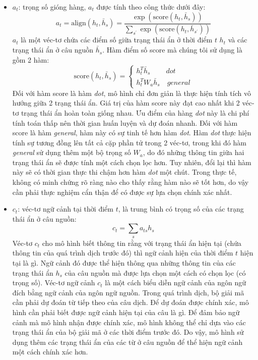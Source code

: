 \begin{itemize}
	\item $a_t$: trọng số gióng hàng, $a_t$ được tính theo công thức dưới đây:
	\begin{equation}
	a_t = \text{align}(h_t, \bar{h}_s) = \frac{\exp\left(\text{score}(h_t, \bar{h}_s)\right)}{\sum_{s^{'}}\exp\left(\text{score}(h_t, \bar{h}_{s^{'}})\right)}
	\end{equation}
	$a_t$ là một véc-tơ chứa các điểm số giữa trạng thái ẩn ở thời điểm $t$ $h_t$ và các trạng thái ẩn ở câu nguồn $\bar{h}_s$. Hàm điểm số score mà chúng tôi sử dụng là gồm 2 hàm:
	\begin{equation}
	\text{score}(h_t, \bar{h}_s) = \left\{
			\begin{array}{ll}
			h^T_t\bar{h}_s \ \quad\quad dot\\
			h^T_tW_a\bar{h}_s	\quad general
			\end{array}
		\right.
	\end{equation}
	Đối với hàm score là hàm \textit{dot}, mô hình chỉ đơn giản là thực hiện tính tích vô hướng giữa 2 trạng thái ẩn. Giá trị của hàm score này đạt cao nhất khi 2 véc-tơ trạng thái ẩn hoàn toàn giống nhau. Ưu điểm của hàng \textit{dot} này là chi phí tính toán thấp nên thời gian huấn luyện và dự đoán nhanh.
	Đối với hàm score là hàm \textit{general}, hàm này có sự tinh tế hơn hàm \textit{dot}. Hàm \textit{dot} thực hiện tính sự tương đồng lên tất cả cặp phần tử trong 2 véc-tơ, trong khi đó hàm \textit{general} sử dụng thêm một bộ trọng số $W_a$, do đó những thông tin giữa hai trạng thái ẩn sẽ được tính một cách chọn lọc hơn. Tuy nhiên, đổi lại thì hàm này sẽ có thời gian thực thi chậm hơn hàm \textit{dot} một chút. Trong thực tế, không có minh chứng rõ ràng nào cho thấy rằng hàm nào sẽ tốt hơn, do vậy cần phải thực nghiệm cẩn thận để có được sự lựa chọn chính xác nhất.
	\item $c_t$: véc-tơ ngữ cảnh tại thời điểm $t$, là trung bình có trọng số của các trạng thái ẩn ở câu nguồn:
	\begin{equation}
	c_t = \sum_{s}a_{ts}h_s
	\end{equation}
	Véc-tơ $c_t$ cho mô hình biết thông tin rằng với trạng thái ẩn hiện tại (chứa thông tin của quá trình dịch trước đó) thì ngữ cảnh hiện của thời điểm $t$ hiện tại là gì. Ngữ cảnh đó được thể hiện thông qua những thông tin của các trạng thái ẩn $h_s$ của câu nguồn mà được lựa chọn một cách có chọn lọc (có trọng số). Véc-tơ ngữ cảnh $c_t$ là một cách biểu diễn ngữ cảnh của ngôn ngữ đích bằng ngữ cảnh của ngôn ngữ nguồn. Trong quá trình dịch, bộ giải mã cần phải dự đoán từ tiếp theo của câu dịch. Để dự đoán được chính xác, mô hình cần phải biết được ngữ cảnh hiện tại của câu là gì. Để đảm bảo ngữ cảnh mà mô hình nhận được chính xác, mô hình không thể chỉ dựa vào các trạng thái ẩn của bộ giải mã ở các thời điểm trước đó. Do vậy, mô hình sử dụng thêm các trạng thái ẩn của các từ ở câu nguồn để thể hiện ngữ cảnh một cách chính xác hơn.

\end{itemize}

